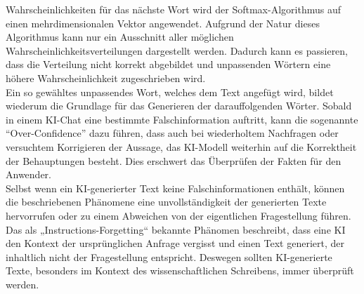 \documentclass[../main.tex]{subfiles}
\begin{document}
Wahrscheinlichkeiten für das nächste Wort wird der Softmax-Algorithmus auf einen mehrdimensionalen Vektor angewendet. Aufgrund der Natur dieses Algorithmus kann nur 
ein Ausschnitt aller möglichen Wahrscheinlichkeitsverteilungen dargestellt werden. Dadurch kann es passieren, dass die Verteilung nicht korrekt abgebildet und 
unpassenden Wörtern eine höhere Wahrscheinlichkeit zugeschrieben wird.\cite{softmax} \\
Ein so gewähltes unpassendes Wort, welches dem Text angefügt wird, bildet wiederum die Grundlage für das Generieren der darauffolgenden Wörter. Sobald in einem KI-Chat eine 
bestimmte Falschinformation auftritt, kann die sogenannte “Over-Confidence” dazu führen, dass auch bei wiederholtem Nachfragen oder versuchtem Korrigieren der 
Aussage, das KI-Modell weiterhin auf die Korrektheit der Behauptungen besteht. Dies erschwert das Überprüfen der Fakten für den Anwender.\cite{allgemHalluzinationen,softmax} \\
Selbst wenn ein KI-generierter Text keine Falschinformationen enthält, können die beschriebenen Phänomene eine unvollständigkeit der generierten Texte hervorrufen 
oder zu einem Abweichen von der eigentlichen Fragestellung führen.  Das als „Instructions-Forgetting“ bekannte Phänomen beschreibt, dass eine KI den Kontext der 
ursprünglichen Anfrage vergisst und einen Text generiert, der inhaltlich nicht der Fragestellung entspricht. Deswegen sollten KI-generierte Texte, besonders im Kontext 
des wissenschaftlichen Schreibens, immer überprüft werden.\cite{allgemHalluzinationen}
\end{document}
